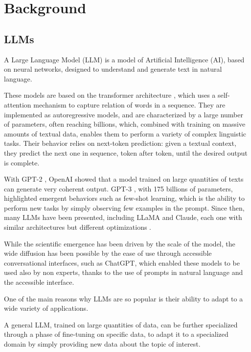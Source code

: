 \section{Background}
\label{sec:background}


\subsection{LLMs} %
A Large Language Model (LLM) is a model of Artificial Intelligence (AI), based on neural networks, designed to understand and generate text in natural language.

These models are based on the transformer architecture \cite{vaswani2023attentionneed}, which uses a self-attention mechanism to capture relation of words in a sequence.
They are implemented as autoregressive models, and are characterized by a large number of parameters, often reaching billions, which, combined with training on massive amounts of textual data, enables them to perform a variety of complex linguistic tasks.
Their behavior relies on next-token prediction: given a textual context, they predict the next one in sequence, token after token, until the desired output is complete.

\medskip
With GPT-2 \cite{radford2019language}, OpenAI showed that a model trained on large quantities of texts can generate very coherent output.
GPT-3 \cite{brown2020LMfewshot}, with 175 billions of parameters, highlighted emergent behaviors such as few-shot learning, which is the ability to perform new tasks by simply observing few examples in the prompt.
Since then, many LLMs have been presented, including LLaMA and Claude, each one with similar architectures but different optimizations \cite{wang2025llm}.

While the scientific emergence has been driven by the scale of the model, the wide diffusion has been possible by the ease of use through accessible conversational interfaces, such as ChatGPT, which enabled these models to be used also by non experts, thanks to the use of prompts in natural language and the accessible interface.

\medskip
One of the main reasons why LLMs are so popular is their ability to adapt to a wide variety of applications.

A general LLM, trained on large quantities of data, can be further specialized through a phase of fine-tuning on specific data, to adapt it to a specialized domain by simply providing new data about the topic of interest.

